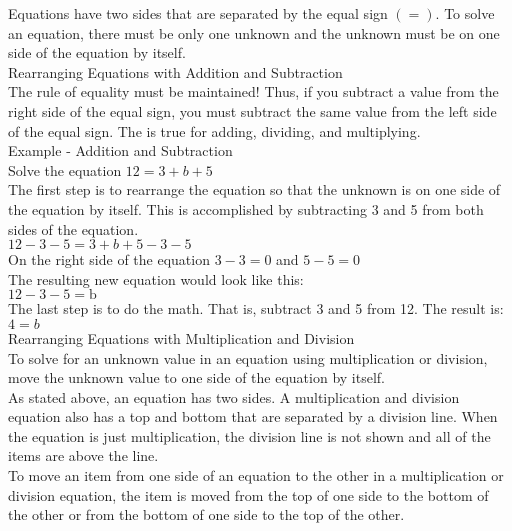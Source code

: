 Equations have two sides that are separated by the equal sign $(=)$. To solve an equation, there must be only one unknown and the unknown must be on one side of the equation by itself.\\
Rearranging Equations with Addition and Subtraction\\

The rule of equality must be maintained! Thus, if you subtract a value from the right side of the equal sign, you must subtract the same value from the left side of the equal sign. The is true for adding, dividing, and multiplying.\\

Example - Addition and Subtraction\\
Solve the equation $12=3+b+5$\\

The first step is to rearrange the equation so that the unknown is on one side of the equation by itself. This is accomplished by subtracting 3 and 5 from both sides of the equation.\\

$12-3-5=3+b+5-3-5$\\

On the right side of the equation $3-3=0$ and $5-5=0$\\

The resulting new equation would look like this:\\

$12-3-5=\mathrm{b}$\\

The last step is to do the math. That is, subtract 3 and 5 from 12. The result is: $4=b$\\

Rearranging Equations with Multiplication and Division\\
To solve for an unknown value in an equation using multiplication or division, move the unknown value to one side of the equation by itself.\\

As stated above, an equation has two sides. A multiplication and division equation also has a top and bottom that are separated by a division line. When the equation is just multiplication, the division line is not shown and all of the items are above the line.\\

To move an item from one side of an equation to the other in a multiplication or division equation, the item is moved from the top of one side to the bottom of the other or from the bottom of one side to the top of the other.\\

